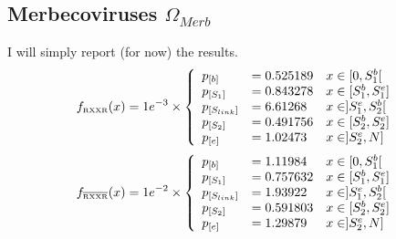\documentclass[pdflatex,sn-basic,iicol]{sn-jnl}%
\begin{document}
\subsection{Merbecoviruses $\Omega_{Merb}$}
I will simply report (for now) the results.
\[
    f_{\scriptscriptstyle{\text{RXXR}}}(x) = 1e^{-3} \times \left \{  
        \begin{array}{l l l}
            p_{[b]}         & = 0.525189    & x \in [0, S_1^{b}[        \\
            p_{[S_1]}       & = 0.843278    & x \in [S_1^{b}, S_1^{e}]  \\
            p_{[S_{link}]}  & = 6.61268     & x \in ]S_1^{e}, S_2^{b}[  \\
            p_{[S_2]}       & = 0.491756    & x \in [S_2^{b}, S_2^{e}]   \\
            p_{[e]}         & = 1.02473     & x \in ]S_2^{e}, N]
        \end{array}   \right . 
\]
\[
    f_{\scriptscriptstyle{\overline{\text{RXXR}}}}(x) = 1e^{-2} \times \left \{  
        \begin{array}{l l l}
            p_{[b]}         & = 1.11984     & x \in [0, S_1^{b}[        \\
            p_{[S_1]}       & = 0.757632    & x \in [S_1^{b}, S_1^{e}]  \\
            p_{[S_{link}]}  & = 1.93922     & x \in ]S_1^{e}, S_2^{b}[  \\
            p_{[S_2]}       & = 0.591803    & x \in [S_2^{b}, S_2^{e}]   \\
            p_{[e]}         & = 1.29879     & x \in ]S_2^{e}, N]
        \end{array}   \right . 
\]
\end{document}
